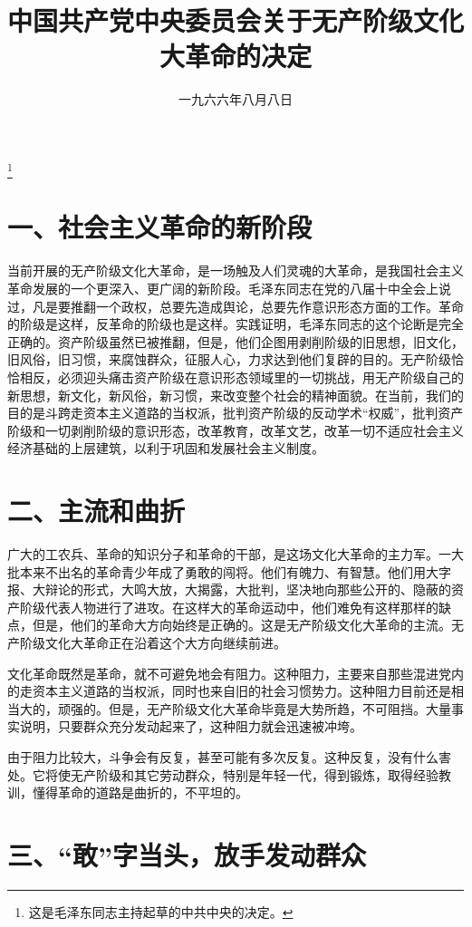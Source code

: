 
\title{中国共产党中央委员会关于无产阶级文化大革命的决定}
\date{一九六六年八月八日}
\thanks{这是毛泽东同志主持起草的中共中央的决定。}
\maketitle


\section{一、社会主义革命的新阶段}

当前开展的无产阶级文化大革命，是一场触及人们灵魂的大革命，是我国社会主义革命发展的一个更深入、更广阔的新阶段。毛泽东同志在党的八届十中全会上说过，凡是要推翻一个政权，总要先造成舆论，总要先作意识形态方面的工作。革命的阶级是这样，反革命的阶级也是这样。实践证明，毛泽东同志的这个论断是完全正确的。资产阶级虽然已被推翻，但是，他们企图用剥削阶级的旧思想，旧文化，旧风俗，旧习惯，来腐蚀群众，征服人心，力求达到他们复辟的目的。无产阶级恰恰相反，必须迎头痛击资产阶级在意识形态领域里的一切挑战，用无产阶级自己的新思想，新文化，新风俗，新习惯，来改变整个社会的精神面貌。在当前，我们的目的是斗跨走资本主义道路的当权派，批判资产阶级的反动学术“权威”，批判资产阶级和一切剥削阶级的意识形态，改革教育，改革文艺，改革一切不适应社会主义经济基础的上层建筑，以利于巩固和发展社会主义制度。

\section{二、主流和曲折}

广大的工农兵、革命的知识分子和革命的干部，是这场文化大革命的主力军。一大批本来不出名的革命青少年成了勇敢的闯将。他们有魄力、有智慧。他们用大字报、大辩论的形式，大鸣大放，大揭露，大批判，坚决地向那些公开的、隐蔽的资产阶级代表人物进行了进攻。在这样大的革命运动中，他们难免有这样那样的缺点，但是，他们的革命大方向始终是正确的。这是无产阶级文化大革命的主流。无产阶级文化大革命正在沿着这个大方向继续前进。

文化革命既然是革命，就不可避免地会有阻力。这种阻力，主要来自那些混进党内的走资本主义道路的当权派，同时也来自旧的社会习惯势力。这种阻力目前还是相当大的，顽强的。但是，无产阶级文化大革命毕竟是大势所趋，不可阻挡。大量事实说明，只要群众充分发动起来了，这种阻力就会迅速被冲垮。

由于阻力比较大，斗争会有反复，甚至可能有多次反复。这种反复，没有什么害处。它将使无产阶级和其它劳动群众，特别是年轻一代，得到锻炼，取得经验教训，懂得革命的道路是曲折的，不平坦的。

\section{三、“敢”字当头，放手发动群众}

